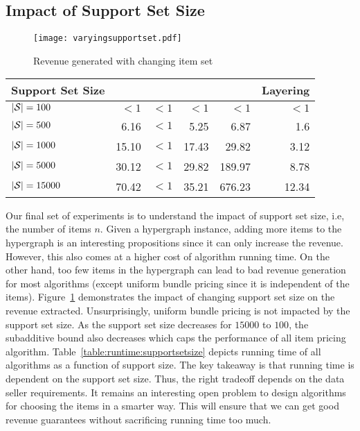 \subsection{Impact of Support Set Size}


\begin{figure}[!t]
	\centering
	\texttt{[image: varyingsupportset.pdf]}
	\caption{Revenue generated with changing item set} \label{fig:supportsetsize}
\end{figure}  

\begin{table*}
	\begin{small}
		\begin{tabular}{@{}lrrrrr@{}}\toprule
			\textbf{Support Set Size} & \textbf{\lpip} & \textbf{\ubp} & \textbf{\uip} & \textbf{\cip} & \textbf{Layering}  \\ \midrule
			
			$|\mathcal{S}| = 100$ &  $<1$ & $<1$ & $<1$ & $<1$ & $<1$ \\ \hdashline
			$|\mathcal{S}| = 500$ &  6.16 & $<1$ &  5.25 & 6.87 & 1.6 \\ \hdashline
			$|\mathcal{S}| = 1000$ &  15.10 & $<1$ &  17.43 & 29.82 & 3.12 \\ \hdashline
			$|\mathcal{S}| = 5000$ &  30.12 & $<1$ &  29.82 & 189.97 & 8.78 \\ \hdashline
			$|\mathcal{S}| = 15000$ &  70.42 & $<1$ &  35.21 & 676.23 & 12.34 \\
			\bottomrule
		\end{tabular}
	\end{small}
	\caption{Algorithm running times (in seconds) for skewed workload}
	\label{table:runtime:supportsetsize}
\end{table*}

Our final set of experiments is to understand the impact of support set size, i.e, the number of items $n$. Given a hypergraph instance, adding more items to the hypergraph is an interesting propositions since it can only increase the revenue. However, this also comes at a higher cost of algorithm running time. On the other hand, too few items in the hypergraph can lead to bad revenue generation for most algorithms (except uniform bundle pricing since it is independent of the items). Figure~\ref{fig:supportsetsize} demonstrates the impact of changing support set size on the revenue extracted. Unsurprisingly, uniform bundle pricing is not impacted by the support set size. As the support set size decreases for $15000$ to $100$, the subadditive bound also decreases which caps the performance of all item pricing algorithm. Table~\ref{table:runtime:supportsetsize} depicts running time of all algorithms as a function of support size. The key takeaway is that running time is dependent on the support set size. Thus, the right tradeoff depends on the data seller requirements. It remains an interesting open problem to design algorithms for choosing the items in a smarter way. This will ensure that we can get good revenue guarantees without sacrificing running time too much.

